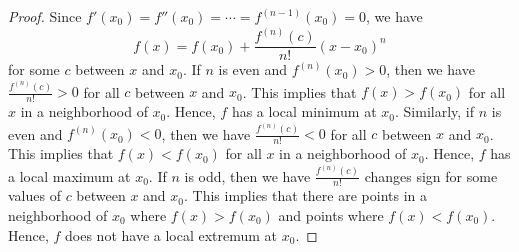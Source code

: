 \documentclass[openany]{book}
\begin{document}
\begin{proof}
    Since $f'(x_0) = f''(x_0) = \cdots = f^{(n-1)}(x_0) = 0$, we have
    \[
        f(x) = f(x_0) + \frac{f^{(n)}(c)}{n!}(x - x_0)^n
    \]
    for some $c$ between $x$ and $x_0$. If $n$ is even and $f^{(n)}(x_0) > 0$, then we have $\frac{f^{(n)}(c)}{n!} > 0$ for all $c$ between $x$ and $x_0$. This implies that $f(x) > f(x_0)$ for all $x$ in a neighborhood of $x_0$. Hence, $f$ has a local minimum at $x_0$. Similarly, if $n$ is even and $f^{(n)}(x_0) < 0$, then we have $\frac{f^{(n)}(c)}{n!} < 0$ for all $c$ between $x$ and $x_0$. This implies that $f(x) < f(x_0)$ for all $x$ in a neighborhood of $x_0$. Hence, $f$ has a local maximum at $x_0$. If $n$ is odd, then we have $\frac{f^{(n)}(c)}{n!}$ changes sign for some values of $c$ between $x$ and $x_0$. This implies that there are points in a neighborhood of $x_0$ where $f(x) > f(x_0)$ and points where $f(x) < f(x_0)$. Hence, $f$ does not have a local extremum at $x_0$.
\end{proof}
\end{document}
